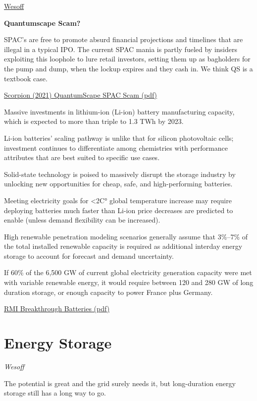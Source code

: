 \documentclass[
]{book}
\begin{document}
\href{https://www.canarymedia.com/articles/quantumscapes-billion-dollar-battery-experiment/}{Wesoff}

\textbf{Quantumscape Scam?}

SPAC's are free to promote absurd financial projections and
timelines that are illegal in a typical IPO. The current SPAC
mania is partly fueled by insiders exploiting this loophole to
lure retail investors, setting them up as bagholders for the
pump and dump, when the lockup expires and they cash in.
We think QS is a textbook case.

\href{pdf/Scorpion_2021_Quantumscape.pdf}{Scorpion (2021) QuantumScape SPAC Scam (pdf)}

Massive investments in lithium-ion (Li-ion) battery manufacturing capacity,
which is expected to more than triple to 1.3 TWh by 2023.

Li-ion batteries' scaling pathway is unlike that for silicon
photovoltaic cells; investment continues to differentiate
among chemistries with performance attributes that are
best suited to specific use cases.

Solid-state technology is poised to massively disrupt
the storage industry by unlocking new opportunities for
cheap, safe, and high-performing batteries.

Meeting electricity goals for \textless2C° global temperature increase
may require deploying batteries much faster than Li-ion price decreases
are predicted to enable (unless demand flexibility can be increased).

High renewable penetration modeling scenarios generally assume that
3\%--7\% of the total installed renewable capacity is required as additional
interday energy storage to account for forecast and demand uncertainty.

If 60\% of the 6,500 GW of current global electricity generation capacity
were met with variable renewable energy, it would require between 120
and 280 GW of long duration storage, or enough capacity to power France
plus Germany.

\href{pdf/rmi_breakthrough_batteries.pdf}{RMI Breakthrough Batteries (pdf)}

\hypertarget{energy-storage}{%
\chapter{Energy Storage}\label{energy-storage}}

\emph{Wesoff}

The potential is great and the grid surely needs it, but long-duration energy storage still has a long way to go.
\end{document}
